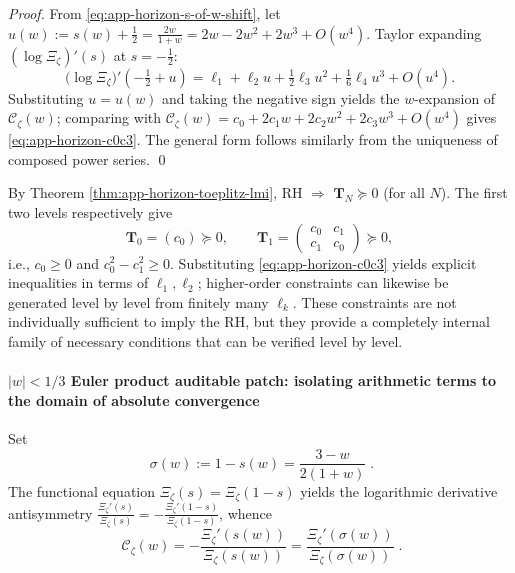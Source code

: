 \begin{proof}
From \eqref{eq:app-horizon-s-of-w-shift}, let \(u(w):=s(w)+\tfrac12=\frac{2w}{1+w}=2w-2w^2+2w^3+O(w^4)\).
Taylor expanding \( (\log\Xi_{\zeta})'(s) \) at \(s=-\tfrac12\):
\[
\bigl(\log\Xi_{\zeta}\bigr)'\!\left(-\tfrac12+u\right)
=\ell_1+\ell_2 u+\tfrac12\ell_3 u^2+\tfrac16\ell_4 u^3+O(u^4).
\]
Substituting \(u=u(w)\) and taking the negative sign yields the \(w\)-expansion of \(\mathscr{C}_{\zeta}(w)\);
comparing with \(\mathscr{C}_{\zeta}(w)=c_0+2c_1w+2c_2w^2+2c_3w^3+O(w^4)\) gives \eqref{eq:app-horizon-c0c3}.
The general form follows similarly from the uniqueness of composed power series. \qed
\end{proof}

\begin{remark}\label{rem:app-horizon-low-level-psd}
By Theorem \ref{thm:app-horizon-toeplitz-lmi}, RH \(\Rightarrow\) \(\mathbf{T}_N\succeq 0\) (for all \(N\)).
The first two levels respectively give
\[
\mathbf{T}_0=(c_0)\succeq 0,
\qquad
\mathbf{T}_1=\begin{pmatrix}c_0&c_1\\c_1&c_0\end{pmatrix}\succeq 0,
\]
i.e., \(c_0\ge 0\) and \(c_0^2-c_1^2\ge 0\).
Substituting \eqref{eq:app-horizon-c0c3} yields explicit inequalities in terms of \(\ell_1,\ell_2\); higher-order constraints can likewise be generated level by level from finitely many \(\ell_k\).
These constraints are not individually sufficient to imply the RH, but they provide a completely internal family of necessary conditions that can be verified level by level.
\end{remark}

\paragraph{\texorpdfstring{$|w|<1/3$}{|w|<1/3} Euler product auditable patch: isolating arithmetic terms to the domain of absolute convergence}
Set
\begin{equation}\label{eq:app-horizon-sigma-def}
\boxed{\;\sigma(w):=1-s(w)=\frac{3-w}{2(1+w)}\; }.
\end{equation}
The functional equation \(\Xi_{\zeta}(s)=\Xi_{\zeta}(1-s)\) yields the logarithmic derivative antisymmetry
\(
\frac{\Xi_{\zeta}'(s)}{\Xi_{\zeta}(s)}=-\frac{\Xi_{\zeta}'(1-s)}{\Xi_{\zeta}(1-s)}
\),
whence
\begin{equation}\label{eq:app-horizon-fe-rewrite}
\boxed{\;
\mathscr{C}_{\zeta}(w)
=-\frac{\Xi_{\zeta}'(s(w))}{\Xi_{\zeta}(s(w))}
=\frac{\Xi_{\zeta}'(\sigma(w))}{\Xi_{\zeta}(\sigma(w))}\; }.
\end{equation}

